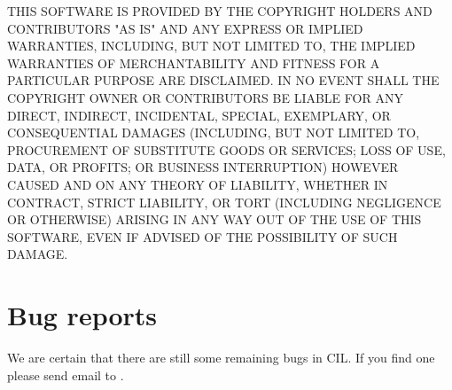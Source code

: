 \documentclass{article}
\begin{document}
THIS SOFTWARE IS PROVIDED BY THE COPYRIGHT HOLDERS AND CONTRIBUTORS "AS IS"
AND ANY EXPRESS OR IMPLIED WARRANTIES, INCLUDING, BUT NOT LIMITED TO, THE
IMPLIED WARRANTIES OF MERCHANTABILITY AND FITNESS FOR A PARTICULAR PURPOSE
ARE DISCLAIMED. IN NO EVENT SHALL THE COPYRIGHT OWNER OR CONTRIBUTORS BE
LIABLE FOR ANY DIRECT, INDIRECT, INCIDENTAL, SPECIAL, EXEMPLARY, OR
CONSEQUENTIAL DAMAGES (INCLUDING, BUT NOT LIMITED TO, PROCUREMENT OF
SUBSTITUTE GOODS OR SERVICES; LOSS OF USE, DATA, OR PROFITS; OR BUSINESS
INTERRUPTION) HOWEVER CAUSED AND ON ANY THEORY OF LIABILITY, WHETHER IN
CONTRACT, STRICT LIABILITY, OR TORT (INCLUDING NEGLIGENCE OR OTHERWISE)
ARISING IN ANY WAY OUT OF THE USE OF THIS SOFTWARE, EVEN IF ADVISED OF THE
POSSIBILITY OF SUCH DAMAGE.

\section{Bug reports}
 
 We are certain that there are still some remaining bugs in CIL. If you find
one please send email to .  
\end{document}
